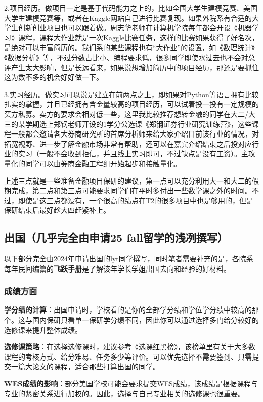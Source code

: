 \documentclass[a4paper,11pt,notitlepage]{article}
\newcommand{\empha}[1]{\textbf{#1}}
\begin{document}
2.项目经历。做项目一定是基于代码能力之上的，比如全国大学生建模竞赛、美国大学生建模竞赛等，或者在Kaggle网站自己进行比赛复现。如果外院系有合适的大学生创新创业项目也可以跟着做。周志华老师在计算机学院每年都会开设《机器学习》课程，课程大作业就是一次Kaggle比赛任务，这样的比赛如果获得了好名次，是绝对可以丰富简历的。我们系的某些课程也有“大作业”的设置，如《数理统计》《数据分析》等，不过分数占比小、编程要求低，很多同学即使水过去也不会对总评产生太大影响，但是长远看来，如果说想增加简历中的项目经历，那还是要抓住这为数不多的机会好好做一下。

3.实习经历。做实习可以说是建立在前两点之上，即如果对Python等语言拥有比较扎实的掌握，并且已经拥有含金量较高的项目经历，可以试着投一投有一定规模的买方私募。卖方的要求会相对低一些，这里我比较推荐想转金融的同学在大二/大三的某学期选上郑钢老师开设的1学分公选课《郑钢证券行业研究训练营》，这些课程一般都会邀请各大券商研究所的首席分析师来给大家介绍目前该行业的情况，对拓宽视野、进一步了解金融市场非常有帮助，还可以在嘉宾介绍结束之后投对应行业的实习（一般不会收到拒信，并且线上实习即可，不过缺点是没有工资）。主攻量化的同学可以由券商金融工程组开始起步和接触量化。

上述三点就是一些准备金融项目保研的建议，第一点可以充分利用大一和大二的假期完成，第二点和第三点可能要求同学们在平时多付出一些数学课之外的时间。不过，即使是这三点都没有，一个很高的绩点在T2的很多项目中也是够用的，但是保研结束后最好趁大四赶紧补上。

\subsection{出国（几乎完全由申请25 fall留学的浅冽撰写）}
以下部分完全由2024年申请出国的lyt同学撰写，同时笔者需要补充的是，各院系每年民间编纂的\empha{飞跃手册}是了解该年学长学姐出国去向和经验的好材料。
\subsubsection{成绩方面}

\textbf{学分绩的计算}：出国申请时，学校看的是你的全部学分绩和学位学分绩中较高的那个。这与国内保研只看单一保研学分绩不同，因此你可以通过选择多门给分较好的选修课来提升整体成绩。

\textbf{选修课策略}：在选择选修课时，建议参考《选课红黑榜》，该榜单里有关于大多数课程的考核方式、给分难易、任务多少等评价。可以优先选择不需要签到、只需提交一篇大论文的课程，适合那些打算出国的同学。

\textbf{WES成绩的影响}：部分美国学校可能会要求提交WES成绩，该成绩是根据课程与专业的紧密关系进行加权的。因此，选择与自己专业相关的选修课也很重要。
\end{document}
